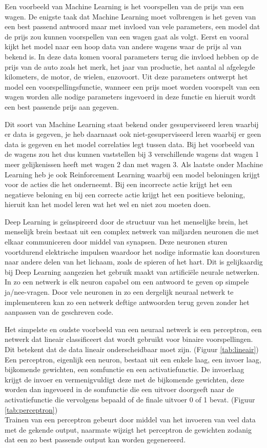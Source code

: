Een voorbeeld van Machine Learning is het voorspellen van de prijs van een wagen.
De enigste taak dat Machine Learning moet volbrengen is het geven van een best passend antwoord maar met invloed van vele parameters, een model dat de prijs zou kunnen voorspellen van een wagen gaat als volgt.
Eerst en vooral kijkt het model naar een hoop data van andere wagens waar de prijs al van bekend is. 
In deze data komen vooral parameters terug die invloed hebben op de prijs van de auto zoals het merk, het jaar van productie, het aantal al afgelegde kilometers, de motor, de wielen, enzovoort. 
Uit deze parameters ontwerpt het model een voorspellingsfunctie, wanneer een prijs moet worden voorspelt van een wagen worden alle nodige parameters ingevoerd in deze functie en hieruit wordt een best passende prijs aan gegeven.

Dit soort van Machine Learning staat bekend onder gesuperviseerd leren waarbij er data is gegeven, je heb daarnaast ook niet-gesuperviseerd leren waarbij er geen data is gegeven en het model correlaties legt tussen data.
Bij het voorbeeld van de wagens zou het dus kunnen vaststellen bij 3 verschillende wagens dat wagen 1 meer gelijkenissen heeft met wagen 2 dan met wagen 3.
Als laatste onder Machine Learning heb je ook Reinforcement Learning waarbij een model beloningen krijgt voor de acties die het onderneemt. Bij een incorrecte actie krijgt het een negatieve beloning en bij een correcte actie krijgt het een positieve beloning, hieruit kan het model leren wat het wel en niet zou moeten doen.

Deep Learning is geïnspireerd door de structuur van het menselijke brein, het menselijk brein bestaat uit een complex netwerk van miljarden neuronen die met elkaar communiceren door middel van synapsen.
Deze neuronen sturen voortdurend elektrische impulsen waardoor het nodige informatie kan doorsturen naar andere delen van het lichaam, zoals de spieren of het hart.
Dit is gelijkaardig bij Deep Learning aangezien het gebruik maakt van artificiële neurale netwerken. In zo een netwerk is elk neuron capabel om een antwoord te geven op simpele ja/nee-vragen. Door vele neuronen in zo een dergelijk neuraal netwerk te implementeren kan zo een netwerk deftige antwoorden terug geven zonder het aanpassen van de geschreven code.

Het simpelste en oudste voorbeeld van een neuraal netwerk is een perceptron, een netwerk dat lineair classificeert dat wordt gebruikt voor binaire voorspellingen. Dit betekent dat de data lineair onderscheidbaar moet zijn. (Figuur \ref{tab:lineair})\\
Een perceptron, eigenlijk een neuron, bestaat uit een enkele laag, een invoer laag, bijkomende gewichten, een somfunctie en een activatiefunctie.
De invoerlaag krijgt de invoer en vermenigvuldigt deze met de bijkomende gewichten, deze worden dan ingevoerd in de somfunctie die een uitvoer doorgeeft naar de activatiefunctie die vervolgens bepaald of de finale uitvoer 0 of 1 bevat. (Figuur \ref{tab:perceptron})\\
Trainen van een perceptron gebeurt door middel van het invoeren van veel data met de gekende output, naarmate wijzigt het perceptron de gewichten zodanig dat een zo best passende output kan worden gegenereerd.

